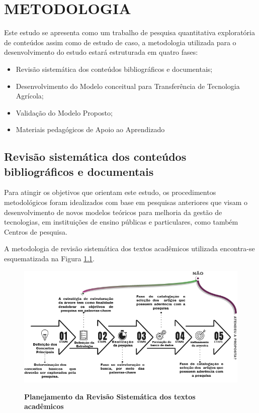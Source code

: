 \chapter{METODOLOGIA}

Este estudo se apresenta como um trabalho de pesquisa quantitativa exploratória de conteúdos assim como de estudo de caso, a metodologia utilizada para o desenvolvimento do estudo estará estruturada em quatro fases: 

\begin{itemize}
    \item Revisão sistemática dos conteúdos bibliográficos e documentais;
    \item Desenvolvimento do Modelo conceitual para Transferência de Tecnologia Agrícola;
    \item Validação do Modelo Proposto;
    \item Materiais pedagógicos de Apoio ao Aprendizado
\end{itemize}

\section{Revisão sistemática dos conteúdos bibliográficos e documentais}

Para atingir os objetivos que orientam este estudo, os procedimentos metodológicos foram idealizados com base em pesquisas anteriores que visam o desenvolvimento de novos modelos teóricos para melhoria da gestão de tecnologias, em instituições de ensino públicas e particulares, como também Centros de pesquisa. 

A metodologia de revisão sistemática dos textos acadêmicos utilizada encontra-se esquematizada na Figura \ref{figura_29}. 

\begin{figure}[H]
\centering
\caption{\textbf{Planejamento da Revisão Sistemática dos textos acadêmicos}}
\includegraphics[scale=0.6]{Imagens/fases_pesquisa_bibliografica.png}
\label{figura_29}
\end{figure}


